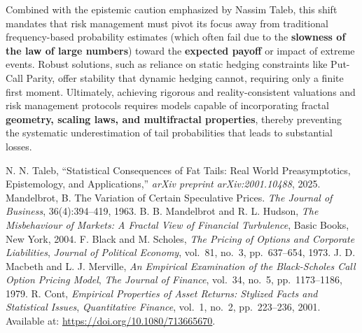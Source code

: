 \documentclass{ieeetj}
\begin{document}
Combined with the epistemic caution emphasized by Nassim Taleb, this shift mandates that risk management must pivot its focus away from traditional frequency-based probability estimates (which often fail due to the \textbf{slowness of the law of large numbers}) toward the \textbf{expected payoff} or impact of extreme events. Robust solutions, such as reliance on static hedging constraints like Put-Call Parity, offer stability that dynamic hedging cannot, requiring only a finite first moment. Ultimately, achieving rigorous and reality-consistent valuations and risk management protocols requires models capable of incorporating fractal \textbf{geometry, scaling laws, and multifractal properties}, thereby preventing the systematic underestimation of tail probabilities that leads to substantial losses.



\begin{thebibliography}{00}
 N. N. Taleb, ``Statistical Consequences of Fat Tails: Real World Preasymptotics, Epistemology, and Applications,'' {\it arXiv preprint arXiv:2001.10488}, 2025.
 Mandelbrot, B. The Variation of Certain Speculative Prices. \textit{The Journal of Business}, 36(4):394--419, 1963.
 B. B. Mandelbrot and R. L. Hudson, {\it The Misbehaviour of Markets: A Fractal View of Financial Turbulence}, Basic Books, New York, 2004.
F. Black and M. Scholes, 
{\it The Pricing of Options and Corporate Liabilities}, 
\textit{Journal of Political Economy}, vol.~81, no.~3, pp.~637--654, 1973. 
J. D. Macbeth and L. J. Merville, 
{\it An Empirical Examination of the Black-Scholes Call Option Pricing Model}, 
\textit{The Journal of Finance}, vol.~34, no.~5, pp.~1173--1186, 1979. 
R. Cont, 
{\it Empirical Properties of Asset Returns: Stylized Facts and Statistical Issues}, 
\textit{Quantitative Finance}, vol.~1, no.~2, pp.~223--236, 2001. 
Available at: \url{https://doi.org/10.1080/713665670}.


\end{thebibliography}


\vfill\pagebreak
\end{document}

